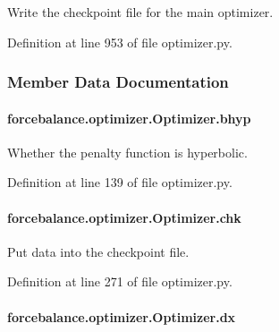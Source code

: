 Write the checkpoint file for the main optimizer. 



Definition at line 953 of file optimizer.\-py.



\subsubsection{Member Data Documentation}
\hypertarget{classforcebalance_1_1optimizer_1_1Optimizer_a83d94779674511a9d31b780b07ea54fb}{
\paragraph[{bhyp}]{\setlength{\rightskip}{0pt plus 5cm}forcebalance.\-optimizer.\-Optimizer.\-bhyp}}\label{classforcebalance_1_1optimizer_1_1Optimizer_a83d94779674511a9d31b780b07ea54fb}


Whether the penalty function is hyperbolic. 



Definition at line 139 of file optimizer.\-py.

\hypertarget{classforcebalance_1_1optimizer_1_1Optimizer_aab04585adf73123d3187aa7dd22e7ce2}{
\paragraph[{chk}]{\setlength{\rightskip}{0pt plus 5cm}forcebalance.\-optimizer.\-Optimizer.\-chk}}\label{classforcebalance_1_1optimizer_1_1Optimizer_aab04585adf73123d3187aa7dd22e7ce2}


Put data into the checkpoint file. 



Definition at line 271 of file optimizer.\-py.

\hypertarget{classforcebalance_1_1optimizer_1_1Optimizer_aaa9b39385a4d067aec12a595da09cc16}{
\paragraph[{dx}]{\setlength{\rightskip}{0pt plus 5cm}forcebalance.\-optimizer.\-Optimizer.\-dx}}\label{classforcebalance_1_1optimizer_1_1Optimizer_aaa9b39385a4d067aec12a595da09cc16}


